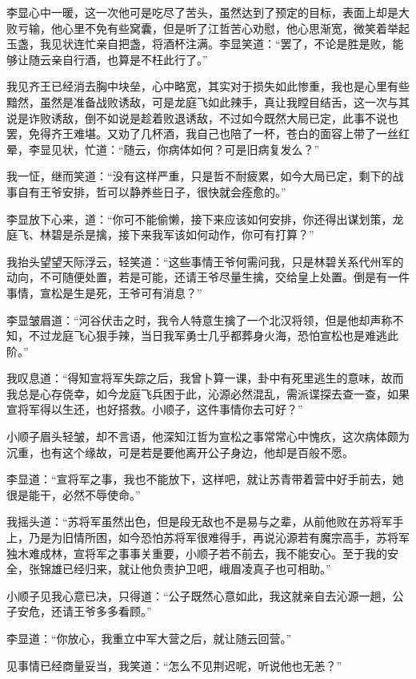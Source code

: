 李显心中一暖，这一次他可是吃尽了苦头，虽然达到了预定的目标，表面上却是大败亏输，他心里不免有些窝囊，但是听了江哲苦心劝慰，他心思渐宽，微笑着举起玉盏，我见状连忙亲自把盏，将酒杯注满。李显笑道：“罢了，不论是胜是败，能够让随云亲自行酒，也算是不枉此行了。”

我见齐王已经消去胸中块垒，心中略宽，其实对于损失如此惨重，我也是心里有些黯然，虽然是准备战败诱敌，可是龙庭飞如此辣手，真让我瞠目结舌，这一次与其说是诈败诱敌，倒不如说是趁着败退诱敌，不过如今既然大局已定，此事不说也罢，免得齐王难堪。又劝了几杯酒，我自己也陪了一杯，苍白的面容上带了一丝红晕，李显见状，忙道：“随云，你病体如何？可是旧病复发么？”

我一怔，继而笑道：“没有这样严重，只是哲不耐疲累，如今大局已定，剩下的战事自有王爷安排，哲可以静养些日子，很快就会痊愈的。”

李显放下心来，道：“你可不能偷懒，接下来应该如何安排，你还得出谋划策，龙庭飞、林碧是杀是擒，接下来我军该如何动作，你可有打算？”

我抬头望望天际浮云，轻笑道：“这些事情王爷何需问我，只是林碧关系代州军的动向，不可随便处置，若是可能，还请王爷尽量生擒，交给皇上处置。倒是有一件事情，宣松是生是死，王爷可有消息？”

李显皱眉道：“河谷伏击之时，我令人特意生擒了一个北汉将领，但是他却声称不知，不过龙庭飞心狠手辣，当日我军勇士几乎都葬身火海，恐怕宣松也是难逃此阶。”

我叹息道：“得知宣将军失踪之后，我曾卜算一课，卦中有死里逃生的意味，故而我总是心存侥幸，如今龙庭飞兵困于此，沁源必然混乱，需派谍探去查一查，如果宣将军得以生还，也好搭救。小顺子，这件事情你去可好？”

小顺子眉头轻皱，却不言语，他深知江哲为宣松之事常常心中愧疚，这次病体颇为沉重，也有这个缘故，可是若是要他离开公子身边，他却是百般不愿。

李显道：“宣将军之事，我也不能放下，这样吧，就让苏青带着营中好手前去，她很是能干，必然不辱使命。”

我摇头道：“苏将军虽然出色，但是段无敌也不是易与之辈，从前他败在苏将军手上，乃是为旧情所困，如今恐怕苏将军很难得手，再说沁源若有魔宗高手，苏将军独木难成林，宣将军之事事关重要，小顺子若不前去，我不能安心。至于我的安全，张锦雄已经归来，就让他负责护卫吧，峨眉凌真子也可相助。”

小顺子见我心意已决，只得道：“公子既然心意如此，我这就亲自去沁源一趟，公子安危，还请王爷多多看顾。”

李显道：“你放心，我重立中军大营之后，就让随云回营。”

见事情已经商量妥当，我笑道：“怎么不见荆迟呢，听说他也无恙？”

